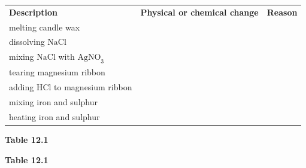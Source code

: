           \begin{table}[H]
        \begin{center}
      \label{m38709*id63990}
    \noindent
      \tablelasttail{}
      \begin{xtabular}[t]{|l|l|l|}\hline
                  \textbf{Description}
                 &
                  \textbf{Physical or chemical change}
                 &
                  \textbf{Reason}
     \tabularnewline{}
        melting candle wax &
         &
     \tabularnewline{}
        dissolving $\mathrm{NaCl}$ &
         &
     \tabularnewline{}
        mixing $\mathrm{NaCl}$ with ${\mathrm{AgNO}}_{3}$ &
         &
     \tabularnewline{}
        tearing magnesium ribbon &
         &
     \tabularnewline{}
        adding $\mathrm{HCl}$ to magnesium ribbon &
         &
     \tabularnewline{}
        mixing iron and sulphur &
         &
     \tabularnewline{}
        heating iron and sulphur &
         &
     \tabularnewline{}
    \end{xtabular}
      \end{center}
    \begin{center}{\small\bfseries Table 12.1}\end{center}
    \begin{caption}{\small\bfseries Table 12.1}\end{caption}
\end{table}
    \par
  \par 
  \label{m38709**end}

